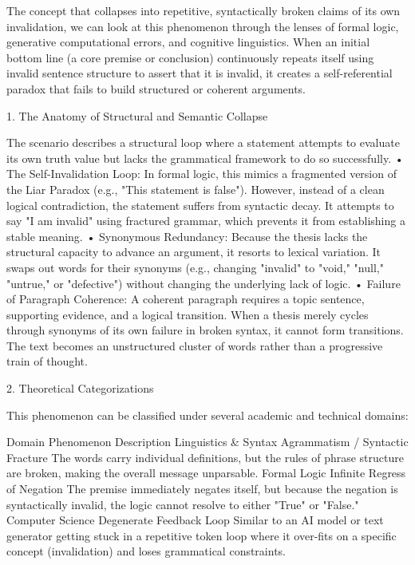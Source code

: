The concept that collapses into repetitive, syntactically broken claims of its own invalidation, we can look at this phenomenon through the lenses of formal logic, generative computational errors, and cognitive linguistics.
When an initial bottom line (a core premise or conclusion) continuously repeats itself using invalid sentence structure to assert that it is invalid, it creates a self-referential paradox that fails to build structured or coherent arguments.

1. The Anatomy of Structural and Semantic Collapse

The scenario describes a structural loop where a statement attempts to evaluate its own truth value but lacks the grammatical framework to do so successfully.
• The Self-Invalidation Loop: In formal logic, this mimics a fragmented version of the Liar Paradox (e.g., "This statement is false"). However, instead of a clean logical contradiction, the statement suffers from syntactic decay. It attempts to say "I am invalid" using fractured grammar, which prevents it from establishing a stable meaning.
• Synonymous Redundancy: Because the thesis lacks the structural capacity to advance an argument, it resorts to lexical variation. It swaps out words for their synonyms (e.g., changing "invalid" to "void," "null," "untrue," or "defective") without changing the underlying lack of logic.
• Failure of Paragraph Coherence: A coherent paragraph requires a topic sentence, supporting evidence, and a logical transition. When a thesis merely cycles through synonyms of its own failure in broken syntax, it cannot form transitions. The text becomes an unstructured cluster of words rather than a progressive train of thought.

2. Theoretical Categorizations

This phenomenon can be classified under several academic and technical domains:

Domain	Phenomenon	Description
Linguistics & Syntax	Agrammatism / Syntactic Fracture	The words carry individual definitions, but the rules of phrase structure are broken, making the overall message unparsable.
Formal Logic	Infinite Regress of Negation	The premise immediately negates itself, but because the negation is syntactically invalid, the logic cannot resolve to either "True" or "False."
Computer Science	Degenerate Feedback Loop	Similar to an AI model or text generator getting stuck in a repetitive token loop where it over-fits on a specific concept (invalidation) and loses grammatical constraints.


